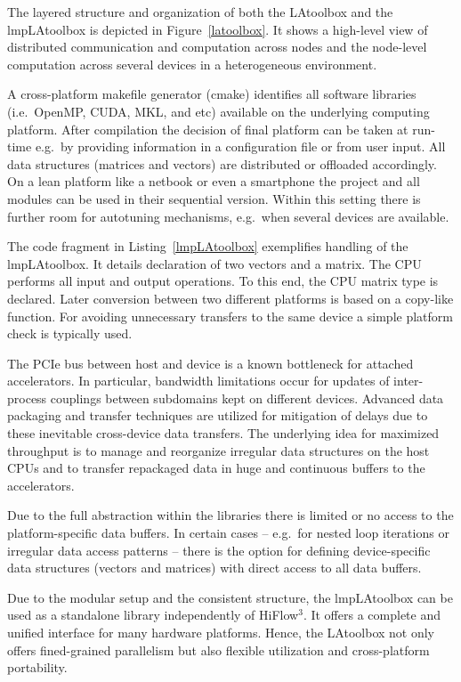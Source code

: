 \documentclass[a4paper, 11pt, twoside]{article}
\begin{document}
The layered structure and organization of both the LAtoolbox and the
lmpLAtoolbox is depicted in Figure~\ref{latoolbox}. It shows a high-level
view of distributed communication and computation across nodes and the
node-level computation across several devices in a heterogeneous environment.

A cross-platform makefile generator (cmake) identifies all software
libraries (i.e.~OpenMP, CUDA, MKL, and etc) available on the underlying
computing platform. After compilation the decision of final platform can be
taken at run-time e.g.~by providing information in a configuration file or from
user input. All data structures (matrices and vectors) are distributed
or offloaded accordingly. On a lean platform like a netbook or even a smartphone
the project and all modules can be used in their sequential version.
Within this setting there is further room for autotuning mechanisms, e.g.~when
several devices are available.

The code fragment in Listing~\ref{lmpLAtoolbox} exemplifies handling of the
lmpLAtoolbox. It details declaration of two vectors and a matrix. The CPU
performs all input and output operations. To this end, the CPU matrix type is
declared. Later conversion between two different platforms is based on a
copy-like function. For avoiding unnecessary transfers to the same device a
simple platform check is typically used.

The PCIe bus between host and device is a known bottleneck for attached
accelerators. In particular, bandwidth limitations occur for updates of
inter-process couplings between subdomains kept on different devices.
Advanced data packaging and transfer techniques are utilized for
mitigation of delays due to these inevitable cross-device data transfers.
The underlying idea for maximized throughput is to manage and reorganize
irregular data structures on the host CPUs and to transfer repackaged data in
huge and continuous buffers to the accelerators. 


Due to the full abstraction within the libraries there is limited or no
access to the platform-specific data buffers. In certain cases -- e.g.~for
nested loop iterations or irregular data access patterns -- there is the option
for defining device-specific data structures (vectors and matrices) with
direct access to all data buffers.



Due to the modular setup and the consistent structure, the lmpLAtoolbox can be
used as a standalone library independently of HiFlow${}^3$. It offers a complete
and unified interface for many hardware platforms. Hence, the LAtoolbox not only
offers fined-grained parallelism but also flexible utilization and
cross-platform portability.
\end{document}
